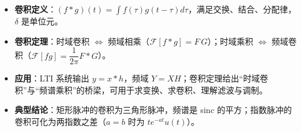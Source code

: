 \begin{itemize}
\tightlist
\item
  \textbf{卷积定义}：\((f*g)(t)=\int f(\tau)g(t-\tau)d\tau\)，满足交换、结合、分配律，\(\delta\)
  是单位元。
\item
  \textbf{卷积定理}：时域卷积 \(\Longleftrightarrow\)
  频域相乘（\(\mathcal F[f*g]=F\,G\)）；时域乘积 \(\Longleftrightarrow\)
  频域卷积（\(\mathcal F[fg]=\dfrac{1}{2\pi}F*G\)）。
\item
  \textbf{应用}：LTI 系统输出 \(y=x*h\)，频域
  \(Y=XH\)；卷积定理给出``时域卷积''与``频谱乘积''的桥梁，可用于求变换、求卷积、理解滤波与调制。
\item
  \textbf{典型结论}：矩形脉冲的卷积为三角形脉冲，频谱是 sinc
  的平方；指数脉冲的卷积可化为两指数之差（\(a=b\) 时为
  \(te^{-at}u(t)\)）。
\end{itemize}

\newpage
